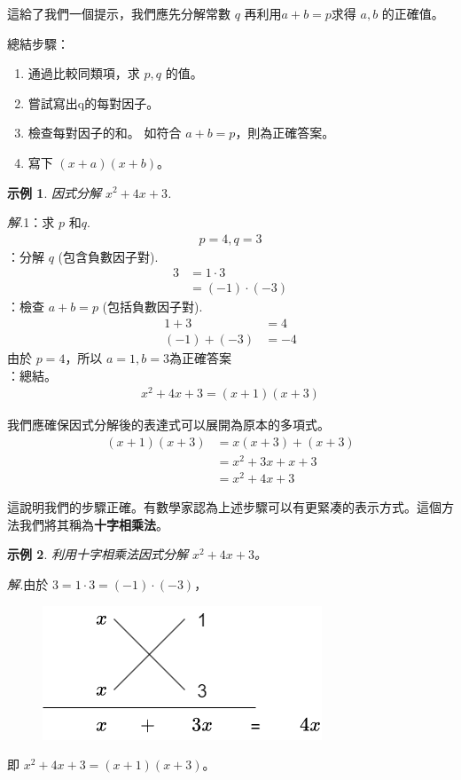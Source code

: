 \documentclass[12pt]{article}
\newtheorem{example}{示例}
\begin{document}
    這給了我們一個提示，我們應先分解常數 $q$ 再利用$a+b=p$求得 $a,b$ 的正確值。

    總結步驟：\begin{enumerate}
        \item 通過比較同類項，求 $p,q$ 的值。
        \item 嘗試寫出q的每對因子。
        \item 檢查每對因子的和。 如符合 $a+b=p$，則為正確答案。
        \item 寫下 $(x+a)(x+b)$。
    \end{enumerate}

    \begin{example}
        因式分解 $x^2+4x+3$.
    \end{example}

    \textit{ 解.}1：求 $p$ 和$q$.
    \begin{align*}
        p=4, q=3
    \end{align*}
    \indent {}：分解 $q$ (包含負數因子對).
    \begin{align*}
        3&=1\cdot 3\\
        &=(-1)\cdot(-3)
    \end{align*}
    \indent {}：檢查 $a+b=p$ (包括負數因子對).
    \begin{align*}
        1+3&=4\\
        (-1)+(-3)&=-4
    \end{align*}
    \indent \indent \indent 由於 $p=4$，所以 $a=1,b=3$為正確答案\\
    \indent {}：總結。
    \begin{align*}
        x^2+4x+3=(x+1)(x+3)
    \end{align*}

    我們應確保因式分解後的表達式可以展開為原本的多項式。\begin{align*}
        (x+1)(x+3)&=x(x+3)+(x+3)\\
        &=x^2+3x+x+3\\
        &=x^2+4x+3
    \end{align*}

    這說明我們的步驟正確。有數學家認為上述步驟可以有更緊凑的表示方式。這個方法我們將其稱為\textbf{十字相乘法}。
    
    \begin{example}
        利用十字相乘法因式分解 $x^2+4x+3$。
    \end{example}

    \textit{ 解.}由於 $3=1\cdot 3=(-1)\cdot(-3)$，
    \begin{figure}[H]
        \centering
        \includegraphics[scale=0.6]{cross-method}
    \end{figure}
    \indent \indent 即 $x^2+4x+3=(x+1)(x+3)$。
\end{document}
